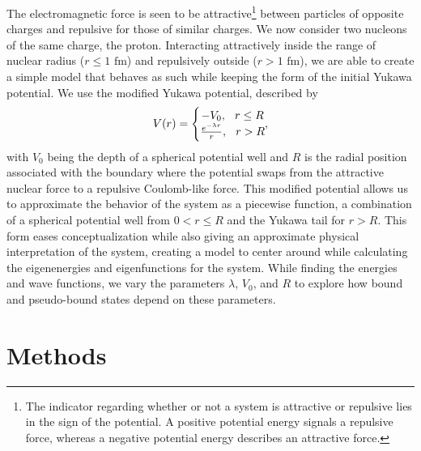 \documentclass[%
 reprint,
nofootinbib,
 amsmath,amssymb,
 aps,
floatfix,
]{revtex4-2}
\begin{document}
{  The electromagnetic force is seen to be attractive\footnote{The indicator regarding whether or not a system is attractive or repulsive lies in the sign of the potential. A positive potential energy signals a repulsive force, whereas a negative potential energy describes an attractive force.} between particles of opposite charges and repulsive for those of similar charges. 
  We now consider two nucleons of the same charge, the proton. 
  Interacting attractively inside the range of nuclear radius ($r \leq 1 \text{ fm}$) and repulsively outside ($r > 1 \text{ fm}$), we are able to create a simple model that behaves as such while keeping the form of the initial Yukawa potential.
  We use the modified Yukawa potential, described by 
  \begin{equation}
    V(r) = \Bigg\{
      \begin{matrix}
        -V_0, \hspace{0.25cm} r \leq R \\
        \frac{e^{-\lambda r}}{r}, \hspace{0.25cm} r > R
      \end{matrix}, \label{eq:2}
  \end{equation}
  with $V_0$ being the depth of a spherical potential well and $R$ is the radial position associated with the boundary where the potential swaps from the attractive nuclear force to a repulsive Coulomb-like force. 
  This modified potential allows us to approximate the behavior of the system as a piecewise function, a combination of a spherical potential well from $0 < r \leq R$ and the Yukawa tail for $r > R$. 
  This form eases conceptualization while also giving an approximate physical interpretation of the system, creating a model to center around while calculating the eigenenergies and eigenfunctions for the system. 
  While finding the energies and wave functions, we vary the parameters $\lambda$, $V_0$, and $R$ to explore how bound and pseudo-bound states depend on these parameters.
}


\section{\label{sec:methods}Methods}

\end{document}
